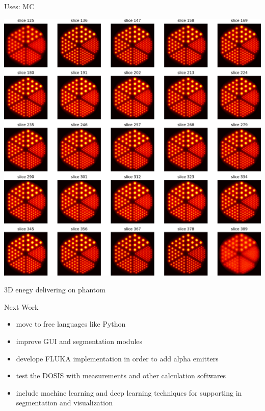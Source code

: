 \documentclass[ignorenonframetext,]{beamer}
\begin{document}
\begin{frame}{Uses: MC}
\protect\hypertarget{uses-mc}{}

\begin{center}
\includegraphics[width=.75\textheight]{imgs/now4.png}
\end{center}

\begin{center}
3D enegy delivering on phantom
\end{center}

\end{frame}

\begin{frame}{Next Work}
\protect\hypertarget{next-work}{}

\begin{itemize}
\item
  move to free languages like Python
\item
  improve GUI and segmentation modules
\item
  develope FLUKA implementation in order to add alpha emitters
\item
  test the DOSIS with measurements and other calculation softwares
\item
  include machine learning and deep learning techniques for supporting
  in segmentation and visualization
\end{itemize}

\end{frame}
\end{document}
